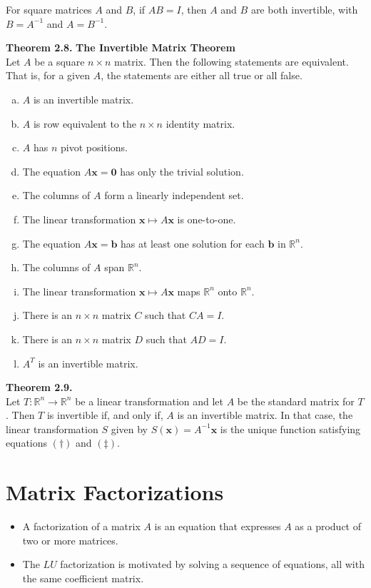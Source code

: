 \documentclass[10pt]{book}
\newenvironment{boxthm}{\begin{mdframed}[backgroundcolor=gray!30,nobreak=true]}{\end{mdframed}}
\newenvironment{boxdef}{\begin{mdframed}[backgroundcolor=gray!30,linewidth=0pt,nobreak=true]}{\end{mdframed}}
\newcommand{\R}{\mathbb{R}}
\newcommand{\vect}[1]{\ensuremath{\boldsymbol{\mathbf{#1}}}}
\newcommand{\Axb}{A\vect{x}=\vect{b}}
\newcommand{\Axz}{A\vect{x}=\vect{0}}
\newcommand{\Ax}{A\vect{x}}
\newcommand{\Tmap}[2]{T:\R^{#1}\to\R^{#2}}
\begin{document}
\begin{boxdef}
	For square matrices $A$ and $B$, if $AB=I$, then $A$ and $B$ are both invertible, with $B=A^{-1}$ and $A=B^{-1}$.
\end{boxdef}
\begin{boxthm}
	\textbf{Theorem 2.8.}
	\textbf{The Invertible Matrix Theorem} \\
	Let $A$ be a square $n\times n$ matrix. Then the following statements are equivalent. That is, for a given $A$, the statements are either all true or all false.
	\begin{enumerate}[(a)]\itemsep0em
		\item $A$ is an invertible matrix.
		\item $A$ is row equivalent to the $n\times n$ identity matrix.
		\item $A$ has $n$ pivot positions.
		\item The equation $\Axz$ has only the trivial solution.
		\item The columns of $A$ form a linearly independent set.
		\item The linear transformation $\vect{x}\mapsto\Ax$ is one-to-one.
		\item The equation $\Axb$ has at least one solution for each $\vect{b}$ in $\R^n$.
		\item The columns of $A$ span $\R^n$.
		\item The linear transformation $\vect{x}\mapsto\Ax$ maps $\R^n$ onto $\R^n$.
		\item There is an $n\times n$ matrix $C$ such that $CA=I$.
		\item There is an $n\times n$ matrix $D$ such that $AD=I$.
		\item $A^T$ is an invertible matrix.
	\end{enumerate}
\end{boxthm}
\begin{boxthm}
	\textbf{Theorem 2.9.} \\
	Let $\Tmap{n}{n}$ be a linear transformation and let $A$ be the standard matrix for $T$. Then $T$ is invertible if, and only if, $A$ is an invertible matrix. In that case, the linear transformation $S$ given by $S(\vect{x})=A^{-1}\vect{x}$ is the unique function satisfying equations $(\dagger)$ and $(\ddagger)$.
\end{boxthm}

\setcounter{section}{4}

\section{Matrix Factorizations}
\begin{itemize}
\item A factorization of a matrix $A$ is an equation that expresses $A$ as a product of two or more matrices.
\item The $LU$ factorization is motivated by solving a sequence of equations, all with the same coefficient matrix.
\end{itemize}
\end{document}
